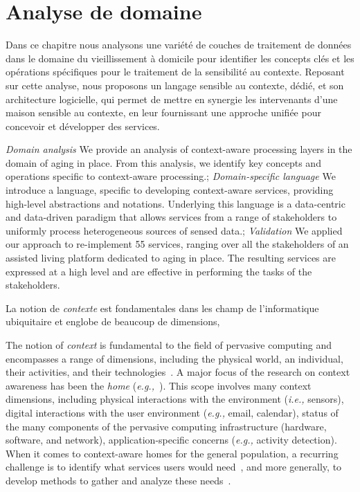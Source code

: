 \chapter{Analyse de domaine}
\begin{preamble}
Dans ce chapitre nous analysons une variété de couches de traitement de données dans le domaine du vieillissement à domicile pour identifier les concepts clés et les opérations spécifiques pour le traitement de la sensibilité au contexte. Reposant sur cette analyse, nous proposons un langage sensible au contexte, dédié, et son architecture logicielle, qui permet de mettre en synergie les intervenants d'une maison sensible au contexte, en leur fournissant une approche unifiée pour concevoir et développer des services.
\end{preamble}
{
{\em Domain analysis} We provide an analysis of context-aware processing layers in the domain of aging in place. From this analysis, we identify key concepts and operations specific to context-aware processing.;
{\em Domain-specific language} We introduce a language, specific to developing context-aware services, providing high-level abstractions and notations. 
Underlying this language is a data-centric and data-driven paradigm that allows services from a range of stakeholders to uniformly process heterogeneous sources of sensed data.;
{\em Validation} We applied our approach to re-implement 55 services, ranging over all the stakeholders of an assisted living platform dedicated to aging in place. The resulting services are expressed at a high level and are effective in performing the tasks of the stakeholders.
}


La notion de {\em contexte} est fondamentales dans les champ de l'informatique ubiquitaire et englobe de beaucoup de dimensions, 


The notion of {\em context} is fundamental to the field of pervasive computing and encompasses a range of dimensions, including the physical world, an individual, their activities, and their technologies~\cite{bauer2012comparison}. 
A major focus of the research on context awareness has been the {\em home} ({\em e.g.,}~\cite{cook2013casas,feminella2014piloteur}). This scope involves many context dimensions, including physical interactions with the environment ({\em i.e.,} sensors), digital interactions with the user environment ({\em e.g.,} email, calendar), status of the many components of the pervasive computing infrastructure (hardware, software, and network), application-specific concerns ({\em e.g.,} activity detection). When it comes to context-aware homes for the general population, a recurring challenge is to identify what services users would need~\cite{brush2011home}, and more generally, to develop methods to gather and analyze these needs~\cite{coutaz2010disqo}.

